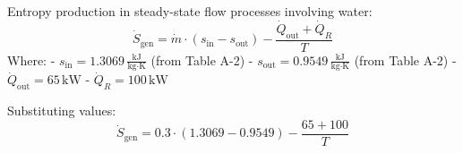Entropy production in steady-state flow processes involving water:  
\[
\dot{S}_{\text{gen}} = \dot{m} \cdot (s_{\text{in}} - s_{\text{out}}) - \frac{\dot{Q}_{\text{out}} + \dot{Q}_R}{T}
\]  
Where:  
- \( s_{\text{in}} = 1.3069 \, \frac{\text{kJ}}{\text{kg·K}} \) (from Table A-2)  
- \( s_{\text{out}} = 0.9549 \, \frac{\text{kJ}}{\text{kg·K}} \) (from Table A-2)  
- \( \dot{Q}_{\text{out}} = 65 \, \text{kW} \)  
- \( \dot{Q}_R = 100 \, \text{kW} \)  

Substituting values:  
\[
\dot{S}_{\text{gen}} = 0.3 \cdot (1.3069 - 0.9549) - \frac{65 + 100}{T}
\]
